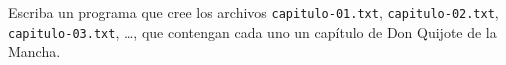 Escriba un programa que cree los archivos
\texttt{capitulo-01.txt},
\texttt{capitulo-02.txt},
\texttt{capitulo-03.txt}, \dots,
que contengan cada uno
un capítulo de Don Quijote de la Mancha.
